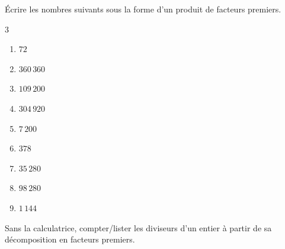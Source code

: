 {\newpage

\begin{Exercice}
Écrire les nombres suivants sous la forme d'un produit de facteurs premiers.
\begin{multicols}{3}
\begin{enumerate}[itemsep=1em]
	\item \begin{minipage}[t]{\linewidth}$ 72 $\end{minipage}
	\item \begin{minipage}[t]{\linewidth}$ 360\,360 $\end{minipage}
	\item \begin{minipage}[t]{\linewidth}$ 109\,200 $\end{minipage}
	\item \begin{minipage}[t]{\linewidth}$ 304\,920 $\end{minipage}
	\item \begin{minipage}[t]{\linewidth}$ 7\,200 $\end{minipage}
	\item \begin{minipage}[t]{\linewidth}$ 378 $\end{minipage}
	\item \begin{minipage}[t]{\linewidth}$ 35\,280 $\end{minipage}
	\item \begin{minipage}[t]{\linewidth}$ 98\,280 $\end{minipage}
	\item \begin{minipage}[t]{\linewidth}$ 1\,144 $\end{minipage}
\end{enumerate}
\end{multicols}
\end{Exercice}



\renewcommand{\arraystretch}{1.1} 
\begin{Exercice}
Sans la calculatrice, compter/lister les diviseurs d'un entier à partir de sa décomposition en facteurs premiers.


\end{Exercice}}
